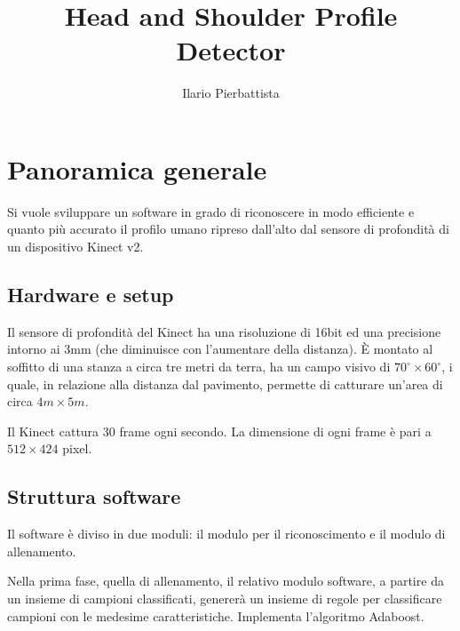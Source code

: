 \documentclass[a4paper,11pt,oneside]{article}
\begin{document}

	\title{Head and Shoulder Profile Detector}
	\author{Ilario Pierbattista}
	\maketitle

	\section{Panoramica generale} %
	\label{sec:panoramica_generale}
		Si vuole sviluppare un software in grado di riconoscere in modo efficiente e quanto più accurato il profilo umano ripreso dall'alto dal sensore di profondità di un dispositivo Kinect v2.

		\subsection{Hardware e setup} %
		\label{sub:hardware_e_setup}
			Il sensore di profondità del Kinect ha una risoluzione di 16bit ed una precisione intorno ai 3mm (che diminuisce con l'aumentare della distanza). È montato al soffitto di una stanza a circa tre metri da terra, ha un campo visivo di $70^{\circ} \times 60^{\circ}$, i quale, in relazione alla distanza dal pavimento, permette di catturare un'area di circa $4m \times 5m$.

			Il Kinect cattura 30 frame ogni secondo. La dimensione di ogni frame è pari a $512 \times 424$ pixel.

		\subsection{Struttura software} %
		\label{sub:struttura_software}
			Il software è diviso in due moduli: il modulo per il riconoscimento e il modulo di allenamento.

			Nella prima fase, quella di allenamento, il relativo modulo software, a partire da un insieme di campioni classificati, genererà un insieme di regole per classificare campioni con le medesime caratteristiche. Implementa l'algoritmo Adaboost.
\end{document}
